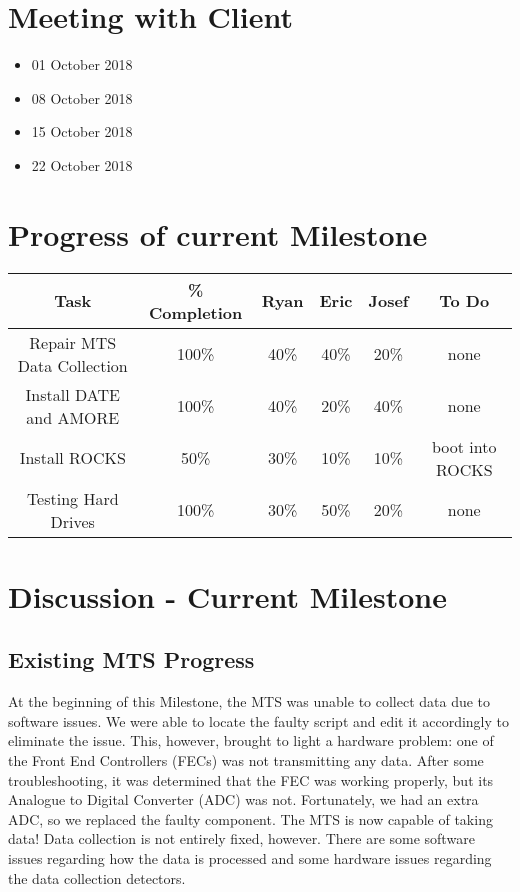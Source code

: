 \documentclass[12pt]{article}
\newcommand\tab[1][1cm]{\hspace*{#1}}
\begin{document}
\section{Meeting with Client}

\begin{itemize}
\item[] 01 October 2018
\item[] 08 October 2018
\item[] 15 October 2018
\item[] 22 October 2018
\end{itemize}

\section{Progress of current Milestone}

  \begin{center}
  \begin{tabular}{|c|c|c|c|c|c|}
    \hline
    Task & \% Completion & Ryan & Eric & Josef & To Do \\
    \hline
    Repair MTS Data Collection & 100\% & 40\% & 40\% & 20\% & none \\
    Install DATE and AMORE & 100\% & 40\% & 20\% & 40\% & none \\
    Install ROCKS & 50\% & 30\% & 10\% & 10\% & boot into ROCKS \\
    Testing Hard Drives & 100\% & 30\% & 50\% & 20\% & none \\
    \hline   
  \end{tabular}
\end{center}

\section{Discussion - Current Milestone}

\subsection{Existing MTS Progress}

\tab At the beginning of this Milestone, the MTS was unable to collect data due
to software issues. We were able to locate the faulty script and edit it
accordingly to eliminate the issue. This, however, brought to light a hardware
problem: one of the Front End Controllers (FECs) was not transmitting any
data. After some troubleshooting, it was determined that the FEC was working
properly, but its Analogue to Digital Converter (ADC) was not. Fortunately, we
had an extra ADC, so we replaced the faulty component. The MTS is now capable of
taking data! Data collection is not entirely fixed, however. There are some
software issues regarding how the data is processed and some hardware issues
regarding the data collection detectors.
\end{document}

